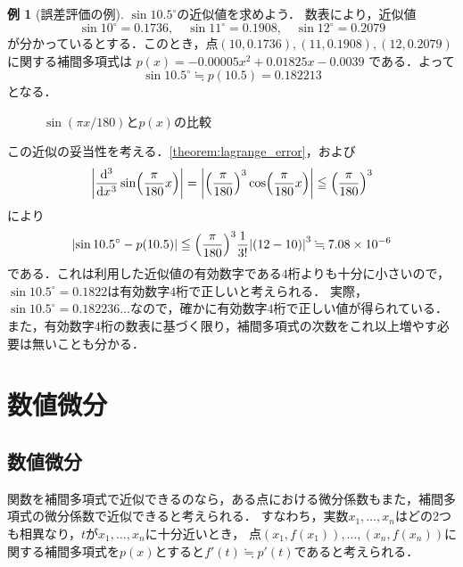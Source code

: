 \documentclass[a4paper]{ltjsarticle}
\theoremstyle{definition}
\newtheorem{example}{例}[section]
\DeclarePairedDelimiter{\abs}{\lvert}{\rvert}
\DeclarePairedDelimiter{\pqty}{\lparen}{\rparen}
\newcommand{\degree}[1]{{#1}^\circ}
\begin{document}
\begin{example}[誤差評価の例]
  $\sin \degree{10.5}$の近似値を求めよう．
  数表により，近似値
  \[
    \sin \degree{10}=0.1736,\quad \sin \degree{11}=0.1908,\quad \sin \degree{12}=0.2079
  \]
  が分かっているとする．このとき，点$(10,0.1736),(11,0.1908),(12,0.2079)$に関する補間多項式は
  $p(x) = -0.00005 x^2 + 0.01825x - 0.0039$
  である．よって
  \[
    \sin \degree{10.5} \fallingdotseq p(10.5) = 0.182213
  \]
  となる．

  \begin{figure}[H]
    \centering
    \caption{$\sin(\pi x/180)$と$p(x)$の比較}
  \end{figure}

  この近似の妥当性を考える．\cref{theorem:lagrange_error}，および
  \[
    \abs*{\diff*[3]{\sin\pqty*{\frac{\pi}{180} x}}{x}} = \abs*{\pqty*{\frac{\pi}{180}}^3\cos\pqty*{\frac{\pi}{180} x}} \leqq \pqty*{\frac{\pi}{180}}^3
  \]
  により
  \[
    \abs*{\sin \degree{10.5} - p(10.5)} \leqq \pqty*{\frac{\pi}{180}}^3 \frac{1}{3!} \abs*{(12-10)}^3 \fallingdotseq 7.08\times 10^{-6}
  \]
  である．これは利用した近似値の有効数字である$4$桁よりも十分に小さいので，$\sin \degree{10.5} =  0.1822$は有効数字$4$桁で正しいと考えられる．
  実際，$\sin \degree{10.5} = 0.182236\dots$なので，確かに有効数字$4$桁で正しい値が得られている．
  また，有効数字$4$桁の数表に基づく限り，補間多項式の次数をこれ以上増やす必要は無いことも分かる．
\end{example}

\section{数値微分}
\subsection{数値微分}
関数を補間多項式で近似できるのなら，ある点における微分係数もまた，補間多項式の微分係数で近似できると考えられる．
すなわち，実数$x_1,\dots,x_n$はどの2つも相異なり，$t$が$x_1,\dots,x_n$に十分近いとき，
点$(x_1,f(x_1)),\dots,(x_n,f(x_n))$に関する補間多項式を$p(x)$とすると$f'(t) \fallingdotseq p'(t)$であると考えられる．
\end{document}

